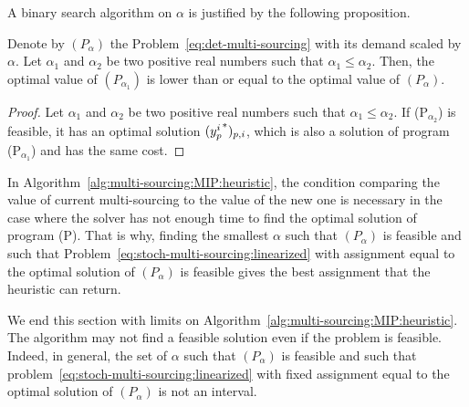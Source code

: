 A binary search algorithm on $\alpha$ is justified by the following proposition.


\begin{prop}
 Denote by $(P_{\alpha})$ the Problem~\eqref{eq:det-multi-sourcing} with its demand scaled by $\alpha$.
 Let $\alpha_1$ and $\alpha_2$ be two positive real numbers such that $\alpha_1\le\alpha_2$.
 Then, the optimal value of $(P_{\alpha_1})$ is lower than or equal to the optimal value of $(P_{\alpha})$.
\end{prop}


\begin{proof}
Let $\alpha_1$ and $\alpha_2$ be two positive real numbers such that $\alpha_1\le\alpha_2$.
If (P$_{\alpha_2}$) is feasible, it has an optimal solution $({y_p^i}^*)_{p,i}$, which is also a solution of program (P$_{\alpha_1}$) and has the same cost.
\end{proof}


In Algorithm~\ref{alg:multi-sourcing:MIP:heuristic}, the condition comparing the value of current multi-sourcing to the value of the new one is necessary in the case where the solver has not enough time to find the optimal solution of program (P).
That is why, finding the smallest $\alpha$ such that $(P_{\alpha})$ is feasible and such that Problem~\eqref{eq:stoch-multi-sourcing:linearized} with assignment equal to the optimal solution of $(P_{\alpha})$ is feasible gives the best assignment that the heuristic can return.


We end this section with limits on Algorithm~\ref{alg:multi-sourcing:MIP:heuristic}.
The algorithm may not find a feasible solution even if the problem is feasible.
Indeed, in general, the set of $\alpha$ such that $(P_{\alpha})$ is feasible and such that problem~\eqref{eq:stoch-multi-sourcing:linearized} with fixed assignment equal to the optimal solution of $(P_{\alpha})$ is not an interval.


